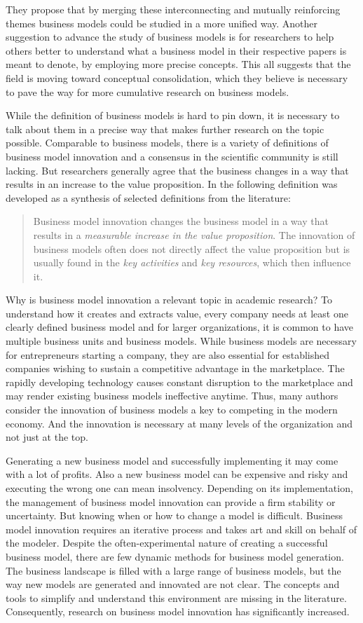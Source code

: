 \documentclass[11pt,a4paper]{article}
\begin{document}
They propose that by merging these interconnecting and mutually reinforcing
themes business models could be studied in a more unified way. Another
suggestion to advance the study of business models is for researchers to help
others better to understand what a business model in their respective papers
is meant to denote, by employing more precise concepts. This all suggests that
the field is moving toward conceptual consolidation, which they believe is
necessary to pave the way for more cumulative research on business models.

While the definition of business models is hard to pin down, it is necessary
to talk about them in a precise way that makes further research on the topic
possible. Comparable to business models, there is a variety of definitions of
business model innovation and a consensus in the scientific community is still
lacking. But researchers generally agree that the business changes in a way
that results in an increase to the value proposition. In \cite{16} the
following definition was developed as a synthesis of selected definitions from
the literature:
\begin{quote}
  Business model innovation changes the business model in a way that results
  in a \emph{measurable increase in the value proposition}. The innovation of
  business models often does not directly affect the value proposition but is
  usually found in the \emph{key activities} and \emph{key resources}, which
  then influence it.
\end{quote}
Why is business model innovation a relevant topic in academic research? To
understand how it creates and extracts value, every company needs at least one
clearly defined business model and for larger organizations, it is common to
have multiple business units and business models. While business models are
necessary for entrepreneurs starting a company, they are also essential for
established companies wishing to sustain a competitive advantage in the
marketplace. The rapidly developing technology causes constant disruption to
the marketplace and may render existing business models ineffective
anytime. Thus, many authors consider the innovation of business models a key
to competing in the modern economy. And the innovation is necessary at many
levels of the organization and not just at the top.

Generating a new business model and successfully implementing it may come with
a lot of profits. Also a new business model can be expensive and risky and
executing the wrong one can mean insolvency. Depending on its implementation,
the management of business model innovation can provide a firm stability or
uncertainty. But knowing when or how to change a model is difficult. Business
model innovation requires an iterative process and takes art and skill on
behalf of the modeler. Despite the often-experimental nature of creating a
successful business model, there are few dynamic methods for business model
generation. The business landscape is filled with a large range of business
models, but the way new models are generated and innovated are not clear. The
concepts and tools to simplify and understand this environment are missing in
the literature. Consequently, research on business model innovation has
significantly increased.
\end{document}
